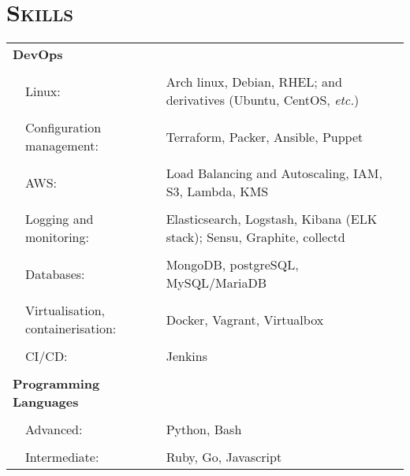 \documentclass[a4paper,10pt]{article} %
\begin{document}
\section{\textsc{Skills}}
\begin{tabularx}{\textwidth}{p{0.3cm}|p{4cm}X}
\multicolumn{2}{l}{\textbf{DevOps}} & \\
\multicolumn{3}{c}{} \\ %
   & Linux:                              & Arch linux, Debian, RHEL; and derivatives (Ubuntu, CentOS,
                                           \emph{etc.}) \\
     \\
   & Configuration management:           & Terraform, Packer, Ansible, Puppet \\
     \\
   & AWS:                                & Load Balancing and Autoscaling, IAM, S3, Lambda, KMS \\
     \\
   & Logging and monitoring:             & Elasticsearch, Logstash, Kibana (ELK stack); Sensu, Graphite,
                                           collectd \\
     \\
   & Databases:                          & MongoDB, postgreSQL, MySQL/MariaDB \\
     \\
   & Virtualisation, containerisation:   & Docker, Vagrant, Virtualbox \\
     \\
   & CI/CD:                              & Jenkins \\
\multicolumn{3}{c}{} \\ %
\multicolumn{2}{l}{\textbf{Programming Languages}}      & \\
\multicolumn{3}{c}{} \\ %
  &  Advanced:                           & Python, Bash \\
     \\
  &  Intermediate:                       & Ruby, Go, Javascript\\
\end{tabularx}
\end{document}
